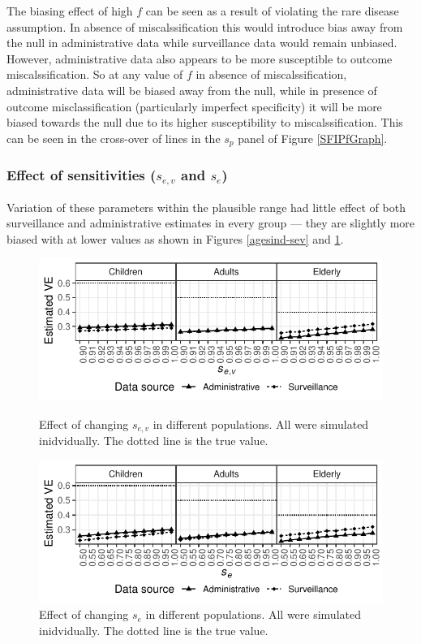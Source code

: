\documentclass[11pt]{article}
\begin{document}
The biasing effect of high $f$ can be seen as a result of violating the rare disease assumption. In absence of miscalssification this would introduce bias away from the null in administrative data while surveillance data would remain unbiased. However, administrative data also appears to be more susceptible to outcome miscalssification. So at any value of $f$ in absence of miscalssification, administrative data will be biased away from the null, while in presence of outcome misclassification (particularly imperfect specificity) it will be more biased towards the null due to its higher susceptibility to miscalssification. This can be seen in the cross-over of lines in the $s_p$ panel of Figure \ref{SFIPfGraph}.

\pagebreak

\subsubsection{Effect of sensitivities ($s_{e,v}$ and $s_e$)}

Variation of these parameters within the plausible range had little effect of both surveillance and administrative estimates in every group --- they are slightly more biased with at lower values as shown in Figures \ref{agesind-sev} and \ref{agesind-spv}.

\begin{figure}[h]
	\centering
		\includegraphics[width=0.75\linewidth]{../fig-agesind/agesind-sens_vac.pdf}
		\caption{
Effect of changing $s_{e,v}$ in different populations. All were simulated inidvidually. The dotted line is the true value. \label{agesind-sev}
		}
		\includegraphics[width=0.75\linewidth]{../fig-agesind/agesind-sens_flu.pdf}
		\caption{
Effect of changing $s_e$ in different populations. All were simulated inidvidually. The dotted line is the true value. \label{agesind-spv}
		}
\end{figure}


\pagebreak
\thispagestyle{plain}

\end{document}
